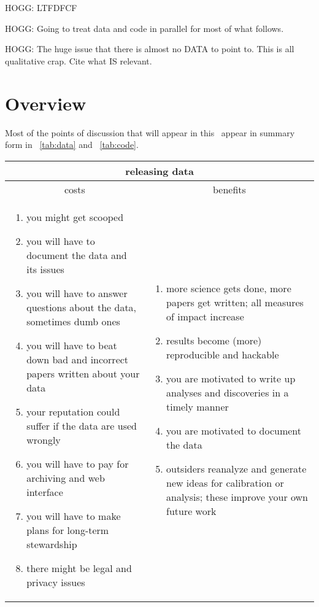 \documentclass[12pt,twoside,pdftex]{article}
\begin{document}
HOGG: LTFDFCF

HOGG: Going to treat data and code in parallel for most of what follows.

HOGG: The huge issue that there is almost no DATA to point to. This is
all qualitative crap. Cite what IS relevant.

\section{Overview}

Most of the points of discussion that will appear in this
\documentname\ appear in summary form in \tablename~\ref{tab:data} and
\tablename~\ref{tab:code}.%
\newlength{\cwidth}\setlength{\cwidth}{0.483\textwidth}%
\begin{table}%
\begin{tabular}{@{}p{\cwidth}|p{\cwidth}@{}}%
\multicolumn{2}{c}{\textbf{releasing data}} \\ \hline
\multicolumn{1}{c|}{costs} & \multicolumn{1}{c}{benefits} \\ \hline
\begin{enumerate}\raggedright
\item you might get scooped
\item you will have to document the data and its issues
\item you will have to answer questions about the data, sometimes dumb ones
\item you will have to beat down bad and incorrect papers written about your data
\item your reputation could suffer if the data are used wrongly
\item you will have to pay for archiving and web interface
\item you will have to make plans for long-term stewardship
\item there might be legal and privacy issues
\end{enumerate}&\begin{enumerate}\raggedright
\item more science gets done, more papers get written; all measures of impact increase
\item results become (more) reproducible and hackable
\item you are motivated to write up analyses and discoveries in a timely manner
\item you are motivated to document the data
\item outsiders reanalyze and generate new ideas for calibration or analysis; these improve your own future work

\end{enumerate}
\end{tabular}
\end{table}
\end{document}
